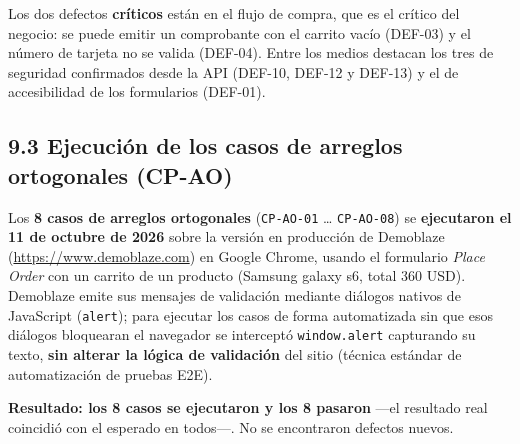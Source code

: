 \documentclass[11pt,a4paper]{article}
\begin{document}
Los dos defectos \textbf{críticos} están en el flujo de compra, que es el crítico del
negocio: se puede emitir un comprobante con el carrito vacío (DEF-03) y el número de
tarjeta no se valida (DEF-04). Entre los medios destacan los tres de seguridad confirmados
desde la API (DEF-10, DEF-12 y DEF-13) y el de accesibilidad de los formularios (DEF-01).

\subsection*{9.3 Ejecución de los casos de arreglos ortogonales (CP-AO)}

Los \textbf{8 casos de arreglos ortogonales} (\texttt{CP-AO-01} \dots{} \texttt{CP-AO-08})
se \textbf{ejecutaron el 11 de octubre de 2026} sobre la versión en producción de Demoblaze
(\url{https://www.demoblaze.com}) en Google Chrome, usando el formulario \emph{Place Order}
con un carrito de un producto (Samsung galaxy s6, total 360 USD). Demoblaze emite sus
mensajes de validación mediante diálogos nativos de JavaScript (\texttt{alert}); para
ejecutar los casos de forma automatizada sin que esos diálogos bloquearan el navegador se
interceptó \texttt{window.alert} capturando su texto, \textbf{sin alterar la lógica de
validación} del sitio (técnica estándar de automatización de pruebas E2E).

\textbf{Resultado: los 8 casos se ejecutaron y los 8 pasaron} —el resultado real coincidió
con el esperado en todos—. No se encontraron defectos nuevos.
\end{document}
